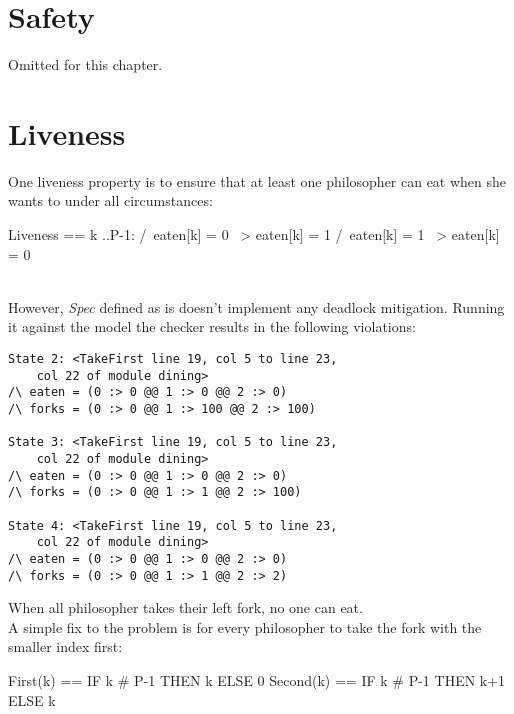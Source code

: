 \section{Safety}

Omitted for this chapter.

\section{Liveness}

One liveness property is to ensure that at least one philosopher can eat when she
wants to under all circumstances:\\

\begin{tla}
Liveness ==
    \E k ..P-1:
        /\ eaten[k] = 0 ~> eaten[k] = 1
        /\ eaten[k] = 1 ~> eaten[k] = 0
\end{tla}
\begin{tlatex}
%
%
%
%
\end{tlatex}
\\

However, \textit{Spec} defined as is doesn't implement any deadlock mitigation.
Running it against the model the checker results in the following violations: 

\begin{verbatim}
State 2: <TakeFirst line 19, col 5 to line 23, 
    col 22 of module dining>
/\ eaten = (0 :> 0 @@ 1 :> 0 @@ 2 :> 0)
/\ forks = (0 :> 0 @@ 1 :> 100 @@ 2 :> 100)

State 3: <TakeFirst line 19, col 5 to line 23, 
    col 22 of module dining>
/\ eaten = (0 :> 0 @@ 1 :> 0 @@ 2 :> 0)
/\ forks = (0 :> 0 @@ 1 :> 1 @@ 2 :> 100)

State 4: <TakeFirst line 19, col 5 to line 23, 
    col 22 of module dining>
/\ eaten = (0 :> 0 @@ 1 :> 0 @@ 2 :> 0)
/\ forks = (0 :> 0 @@ 1 :> 1 @@ 2 :> 2)
\end{verbatim}

When all philosopher takes their left fork, no one can eat. \\

A simple fix to the problem is for every philosopher to take the fork with the
smaller index first:\\

\begin{tla}
First(k) == IF k # P-1 THEN k ELSE 0
Second(k) == IF k # P-1 THEN k+1 ELSE k
\end{tla}
\begin{tlatex}
\end{tlatex}
\\

